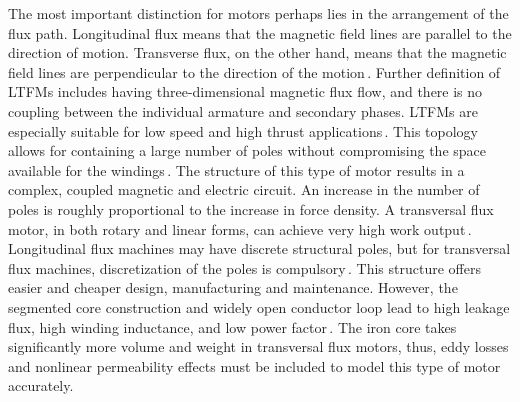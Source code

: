         
        The most important distinction for motors perhaps lies in the arrangement of the flux path. Longitudinal flux means that the magnetic field lines are parallel to the direction of motion. Transverse flux, on the other hand, means that the magnetic field lines are perpendicular to the direction of the motion\,\cite{Laithwaite1975}. Further definition of \acfp{LTFM} includes having three-dimensional magnetic flux flow, and there is no coupling between the individual armature and secondary phases. \acsp{LTFM} are especially suitable for low speed and high thrust applications\,\cite{Zhao2015,Shin2015}. This topology allows for containing a large number of poles without compromising the space available for the windings\,\cite{Laithwaite1971}. The structure of this type of motor results in a complex, coupled magnetic and electric circuit. An increase in the number of poles is roughly proportional to the increase in force density. A transversal flux motor, in both rotary and linear forms, can achieve very high work output\,\cite{Ueda2014,Hsu2011,Wang2016,Arshad2001,Siatkowski2008}. Longitudinal flux machines may have discrete structural poles, but for transversal flux machines, discretization of the poles is compulsory\,\cite{Baoming2009}. This structure offers easier and cheaper design, manufacturing and maintenance. However, the segmented core construction and widely open conductor loop lead to high leakage flux, high winding inductance, and low power factor\,\cite{Harris1997,Lu2003}. The iron core takes significantly more volume and weight in transversal flux motors, thus, eddy losses and nonlinear permeability effects must be included to model this type of motor accurately.
        
